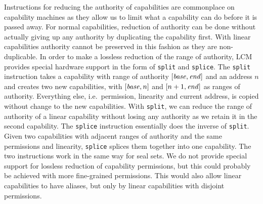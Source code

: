 \documentclass[acmsmall,screen]{acmart}\settopmatter{}
\newcommand{\trgcm}{\textsc{LCM}}
\begin{document}
Instructions for reducing the authority of capabilities are commonplace on capability machines as they allow us to limit what a capability can do before it is passed away.
For normal capabilities, reduction of authority can be done without actually giving up any authority by duplicating the capability first.
With linear capabilities authority cannot be preserved in this fashion as they are non-duplicable.
In order to make a lossless reduction of the range of authority, \trgcm{} provides special hardware support in the form of \texttt{split} and \texttt{splice}.
The \texttt{split} instruction takes a capability with range of authority $[\mathit{base},\mathit{end}]$ and an address $n$ and creates two new capabilities, with $[\mathit{base},n]$ and $[n+1,\mathit{end}]$ as ranges of authority.
Everything else, i.e.\ permission, linearity and current address, is copied without change to the new capabilities.
With \texttt{split}, we can reduce the range of authority of a linear capability without losing any authority as we retain it in the second capability.
The \texttt{splice} instruction essentially does the inverse of \texttt{split}.
Given two capabilities with adjacent ranges of authority and the same permissions and linearity, \texttt{splice} splices them together into one capability.
The two instructions work in the same way for seal sets.
We do not provide special support for lossless reduction of capability permissions, but this could probably be achieved with more fine-grained permissions.
This would also allow linear capabilities to have aliases, but only by linear capabilities with disjoint permissions.
\end{document}

